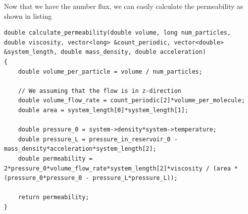 Now that we have the number flux, we can easily calculate the permeability as shown in listing 
\begin{lstlisting}[caption=Calculation of permeability\, assuming that flow is in the $z$-direction., label=lst:dsmc_permeability]
double calculate_permeability(double volume, long num_particles, double viscosity, vector<long> &count_periodic, vector<double> &system_length, double mass_density, double acceleration)
{	
    double volume_per_particle = volume / num_particles;

    // We assuming that the flow is in z-direction
    double volume_flow_rate = count_periodic[2]*volume_per_molecule;
    double area = system_length[0]*system_length[1];

    double pressure_0 = system->density*system->temperature;
    double pressure_L = pressure_in_reservoir_0 - mass_density*acceleration*system_length[2];
    double permeability = 2*pressure_0*volume_flow_rate*system_length[2]*viscosity / (area * (pressure_0*pressure_0 - pressure_L*pressure_L));

    return permeability;
}
\end{lstlisting}